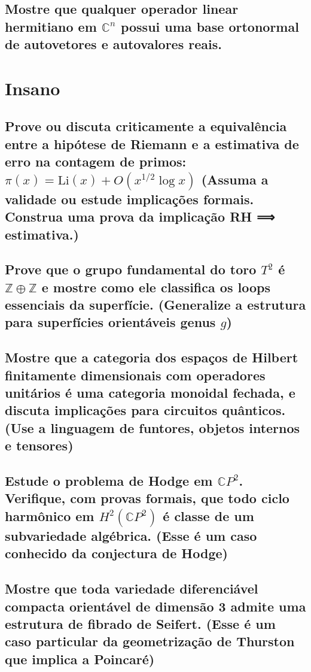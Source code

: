 \documentclass{article}
\begin{document}
\subsection{Mostre que qualquer operador linear hermitiano em $\mathbb{C}^n$ possui uma base ortonormal de autovetores e autovalores reais.}

\section{Insano}

\subsection{Prove ou discuta criticamente a equivalência entre a hipótese de Riemann e a estimativa de erro na contagem de primos: $\pi(x) = \text{Li}(x) + O\left(x^{1/2} \log x\right)$ (Assuma a validade ou estude implicações formais. Construa uma prova da implicação RH ⟹ estimativa.)}

\subsection{Prove que o grupo fundamental do toro $T^2$ é $\mathbb{Z} \oplus \mathbb{Z}$  e mostre como ele classifica os loops essenciais da superfície. (Generalize a estrutura para superfícies orientáveis genus $g$)}

\subsection{Mostre que a categoria dos espaços de Hilbert finitamente dimensionais com operadores unitários é uma categoria monoidal fechada, e discuta implicações para circuitos quânticos.
(Use a linguagem de funtores, objetos internos e tensores)}

\subsection{Estude o problema de Hodge em $\mathbb{C}P^2$. Verifique, com provas formais, que todo ciclo harmônico em $H^{2}( \mathbb{C}P^2 )$ é classe de um subvariedade algébrica.
(Esse é um caso conhecido da conjectura de Hodge)}

\subsection{Mostre que toda variedade diferenciável compacta orientável de dimensão 3 admite uma estrutura de fibrado de Seifert. (Esse é um caso particular da geometrização de Thurston que implica a Poincaré)}
\end{document}

